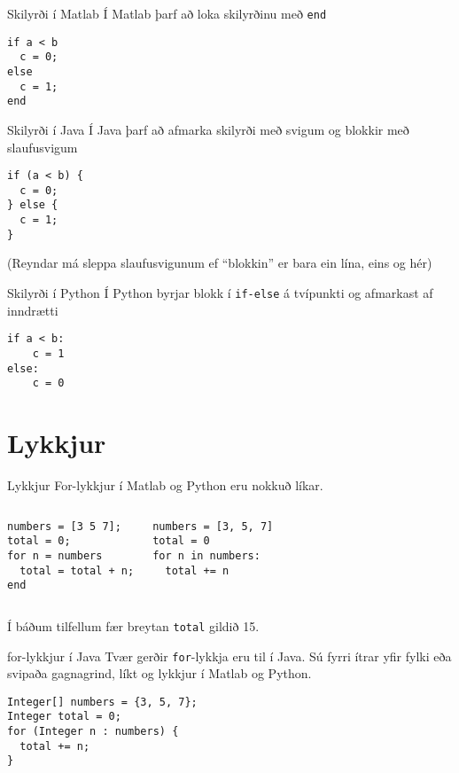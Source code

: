 \documentclass{beamer}
\begin{document}
\begin{frame}[fragile]{Skilyrði í Matlab}
Í Matlab þarf að loka skilyrðinu með \texttt{end}
\begin{verbatim}
if a < b
  c = 0;
else
  c = 1;
end
\end{verbatim}
\end{frame}

\begin{frame}[fragile]{Skilyrði í Java}
Í Java þarf að afmarka skilyrði með svigum og blokkir með slaufusvigum
\begin{verbatim}
if (a < b) {
  c = 0;
} else {
  c = 1;
}
\end{verbatim}
(Reyndar má sleppa slaufusvigunum ef ``blokkin'' er bara ein lína, eins og hér)
\end{frame}

\begin{frame}[fragile]{Skilyrði í Python}
Í Python byrjar blokk í \texttt{if-else} á tvípunkti og afmarkast af inndrætti
\begin{verbatim}
if a < b:
    c = 1
else:
    c = 0
\end{verbatim}
\end{frame}

\section{Lykkjur}

\begin{frame}[fragile]{Lykkjur}
For-lykkjur í Matlab og Python eru nokkuð líkar.
\begin{columns}
\begin{verbatim}
numbers = [3 5 7];
total = 0;
for n = numbers
  total = total + n;
end
\end{verbatim}
\begin{verbatim}
numbers = [3, 5, 7]
total = 0
for n in numbers:
  total += n
\end{verbatim}
\end{columns}
\vspace{\baselineskip}
Í báðum tilfellum fær breytan \texttt{total} gildið 15.
\end{frame}

\begin{frame}[fragile]{for-lykkjur í Java}
Tvær gerðir \texttt{for}-lykkja eru til í Java. Sú fyrri ítrar yfir fylki eða svipaða gagnagrind, líkt og lykkjur í Matlab og Python.
\begin{verbatim}
Integer[] numbers = {3, 5, 7};
Integer total = 0;
for (Integer n : numbers) {
  total += n;
}
\end{verbatim}
\end{frame}
\end{document}
